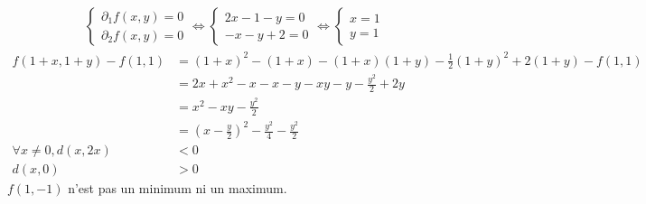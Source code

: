 \documentclass[../main.tex]{subfiles}
\begin{document}
\begin{align*}
    \begin{cases}
        \partial_1 f(x, y) = 0 \\
        \partial_2 f(x, y) = 0
    \end{cases} \Leftrightarrow \begin{cases}
        2x - 1 - y = 0 \\
        -x - y + 2 = 0
    \end{cases} \Leftrightarrow \begin{cases}
        x = 1 \\
        y = 1
    \end{cases}
\end{align*}
\begin{align*}
    f(1 + x, 1 + y) - f(1, 1) &= (1 + x)^2 - (1 + x) - (1 + x)(1 + y) - \frac{1}{2}(1 + y)^2 + 2(1 + y) - f(1, 1) \\
    &= 2x + x^2 - x - x - y - xy - y - \frac{y^2}{2} + 2y \\
    &= x^2 - xy - \frac{y^2}{2} \\
    &= (x - \frac{y}{2})^2 - \frac{y^2}{4} - \frac{y^2}{2} \\
    \forall x\neq 0, d(x, 2x) &< 0 \\
    d(x, 0) &> 0
\end{align*}
$f(1, -1)$ n'est pas un minimum ni un maximum. 
\end{document}
